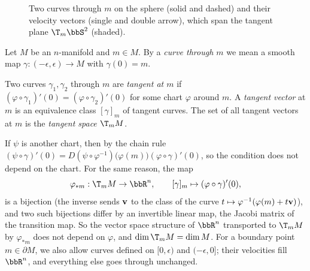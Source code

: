 \begin{figure}[tp]
    \centering
    \caption{Two curves through $m$ on the sphere (solid and dashed) and their velocity vectors (single and double arrow), which span the tangent plane $\T_m\bbS^2$ (shaded).}
    \label{fig tangent plane}
\end{figure}

Let $M$ be an $n$-manifold and $m\in M$. By a \emph{curve through $m$} we mean a smooth map $\gamma:(-\epsilon,\epsilon)\to M$ with $\gamma(0)=m$.

\begin{defn}
    Two curves $\gamma_1,\gamma_2$ through $m$ are \emph{tangent at $m$} if $(\varphi\circ\gamma_1)'(0)=(\varphi\circ\gamma_2)'(0)$ for some chart $\varphi$ around $m$. A \emph{tangent vector} at $m$ is an equivalence class $[\gamma]_m$ of tangent curves. The set of all tangent vectors at $m$ is the \emph{tangent space} $\T_mM$.
\end{defn}
If $\psi$ is another chart, then by the chain rule $(\psi\circ\gamma)'(0)=D(\psi\circ\varphi^{-1})\big(\varphi(m)\big)(\varphi\circ\gamma)'(0)$, so the condition does not depend on the chart. For the same reason, the map
\[\varphi_{\ast m}:\T_mM\to\bbR^n,\qquad[\gamma]_m\mapsto(\varphi\circ\gamma)'(0),\]
is a bijection (the inverse sends $\bf{v}$ to the class of the curve $t\mapsto\varphi^{-1}(\varphi(m)+t\bf{v})$), and two such bijections differ by an invertible linear map, the Jacobi matrix of the transition map. So the vector space structure of $\bbR^n$ transported to $\T_mM$ by $\varphi_{\ast m}$ does not depend on $\varphi$, and $\dim\T_mM=\dim M$. For a boundary point $m\in\partial M$, we also allow curves defined on $[0,\epsilon)$ and $(-\epsilon,0]$; their velocities fill $\bbR^n$, and everything else goes through unchanged.

